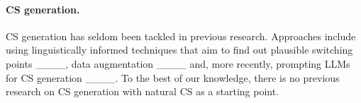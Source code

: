 \paragraph{CS generation.} CS generation has seldom been tackled in previous research. Approaches include using linguistically informed techniques that aim to find out plausible switching points ____, data augmentation ____ and, more recently, prompting LLMs for CS generation ____. To the best of our knowledge, there is no previous research on CS generation with natural CS as a starting point.